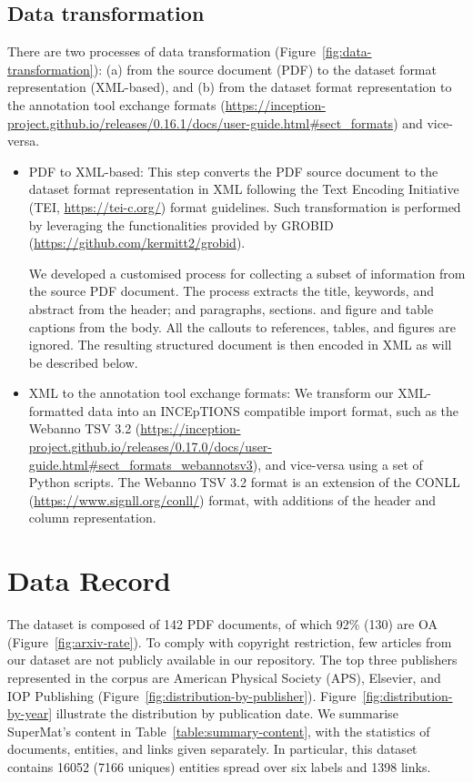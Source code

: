 \documentclass[fleqn,10pt]{wlscirep}
\begin{document}
\subsection*{Data transformation}
\label{subsec:transformation-of-data}
There are two processes of data transformation (Figure~\ref{fig:data-transformation}): (a) from the source document (PDF) to the dataset format representation (XML-based), and (b) from the dataset format representation to the annotation tool exchange formats (\url{https://inception-project.github.io/releases/0.16.1/docs/user-guide.html\#sect_formats}) and vice-versa. 
\begin{itemize}
    \item PDF to XML-based: This step converts the PDF source document to the dataset format representation in XML following the Text Encoding Initiative (TEI, \url{https://tei-c.org/}) format guidelines. 
    Such transformation is performed by leveraging the functionalities provided by GROBID (\url{https://github.com/kermitt2/grobid}).
    
    We developed a customised process for collecting a subset of information from the source PDF document.
    The process extracts the title, keywords, and abstract from the header; and paragraphs, sections. and figure and table captions from the body.
    All the callouts to references, tables, and figures are ignored.
    The resulting structured document is then encoded in XML as will be described below. 
    \item XML to the annotation tool exchange formats: We transform our XML-formatted data into an INCEpTIONS compatible import format, such as the Webanno TSV 3.2 (\url{https://inception-project.github.io/releases/0.17.0/docs/user-guide.html\#sect_formats_webannotsv3}), and vice-versa using a set of Python scripts. 
    The Webanno TSV 3.2 format is an extension of the CONLL (\url{https://www.signll.org/conll/}) format, with additions of the header and column representation.
\end{itemize}

\section*{Data Record}
\label{sec:data-record}
The dataset is composed of 142 PDF documents, of which 92\% (130) are OA (Figure~\ref{fig:arxiv-rate}).
To comply with copyright restriction, few articles from our dataset are not publicly available in our repository. 
The top three publishers represented in the corpus are American Physical Society (APS), Elsevier, and IOP Publishing (Figure~\ref{fig:distribution-by-publisher}).
Figure~\ref{fig:distribution-by-year} illustrate the distribution by publication date.
We summarise SuperMat's content in Table~\ref{table:summary-content}, with the statistics of documents, entities, and links given separately. In particular, this dataset contains 16052 (7166 uniques) entities spread over six labels and 1398 links. 
\end{document}
